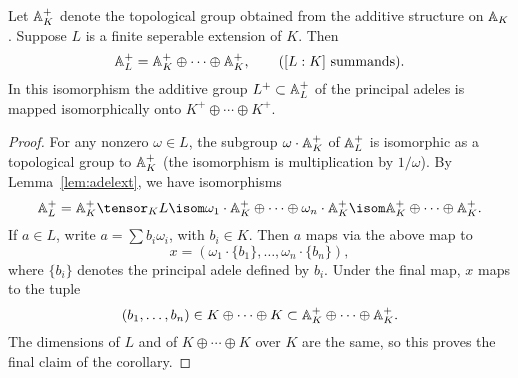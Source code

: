 \begin{corollary}\label{cor:addstruct}
Let $\AA_K^+$ denote the topological group obtained from the
additive structure on $\AA_K$.  Suppose $L$ is a finite seperable
extension of $K$.
 Then 
$$ 
  \AA_L^+ = \AA_K^+ \oplus \cdots \oplus \AA_K^+,
\qquad ([L:K] \text{ summands}).
$$
In this isomorphism the additive group $L^+\subset \AA_L^+$ of the
principal adeles is mapped isomorphically onto $K^+\oplus \cdots
\oplus K^+$.
\end{corollary}
\begin{proof}
For any nonzero $\omega \in L$, the subgroup $\omega\cdot \AA_K^+$
of $\AA_L^+$ is isomorphic as a topological group to $\AA_K^+$
(the isomorphism is multiplication by $1/\omega$).  By
Lemma~\ref{lem:adelext}, we have isomorphisms
$$
\AA_L^+ = \AA_K^+ \tensor_K L 
   \isom \omega_1\cdot \AA_K^+ \oplus \cdots \oplus \omega_n \cdot \AA_K^+
   \isom \AA_K^+ \oplus \cdots \oplus \AA_K^+. 
$$
If $a \in L$, write $a=\sum b_i \omega_i$, with $b_i \in K$.
Then $a$ maps via the above map to 
$$x = (\omega_1\cdot \{b_1\},\ldots, \omega_n \cdot \{b_n\}),$$
where $\{b_i\}$ denotes the principal adele defined by $b_i$.
Under the final map, $x$ maps to the tuple
$$(b_1,\ldots, b_n) \in K\oplus \cdots \oplus K \subset 
\AA_K^+ \oplus \cdots \oplus \AA_K^+.$$
The dimensions of $L$ and of $K\oplus \cdots \oplus K$ over
$K$ are the same, so 
this proves the final claim of the corollary. 
\end{proof}

